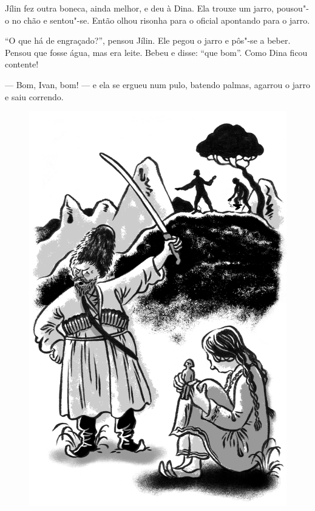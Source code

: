 Jílin fez outra boneca, ainda melhor, e deu à Dina. Ela trouxe um jarro,
pousou"-o no chão e sentou"-se. Então olhou risonha para o oficial
apontando para o jarro.

``O que há de engraçado?'', pensou Jílin. Ele pegou o jarro e pôs"-se a
beber. Pensou que fosse água, mas era leite. Bebeu e disse: ``que bom''.
Como Dina ficou contente!

--- Bom, Ivan, bom! --- e ela se ergueu num pulo, batendo palmas,
agarrou o jarro e saiu correndo.

\begin{figure}%
\vspace*{-1.6cm}
\hspace*{-1.8cm}\includegraphics{./imgs/cena4.jpg}
\end{figure}

